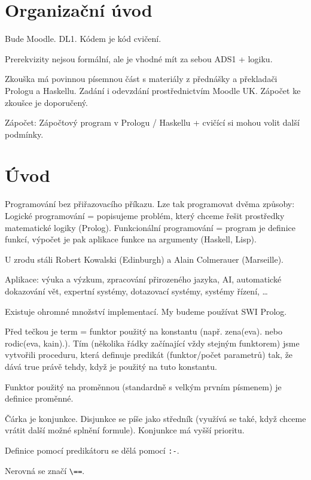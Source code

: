 \documentclass[12pt]{article}					%
\begin{document}

\section*{Organizační úvod}
\begin{poznamka}
	Bude Moodle. DL1. Kódem je kód cvičení.

	Prerekvizity nejsou formální, ale je vhodné mít za sebou ADS1 + logiku.

	Zkouška má povinnou písemnou část s materiály z přednášky a překladači Prologu a Haskellu. Zadání i odevzdání prostřednictvím Moodle UK. Zápočet ke zkoušce je doporučený.

	Zápočet: Zápočtový program v Prologu / Haskellu + cvičící si mohou volit další podmínky.
\end{poznamka}

\section{Úvod}
\begin{definice}
	Programování bez přiřazovacího příkazu. Lze tak programovat dvěma způsoby: Logické programování = popisujeme problém, který chceme řešit prostředky matematické logiky (Prolog). Funkcionální programování = program je definice funkcí, výpočet je pak aplikace funkce na argumenty (Haskell, Lisp).
\end{definice}

\begin{definice}[Prolog]
	U zrodu stáli Robert Kowalski (Edinburgh) a Alain Colmerauer (Marseille).

	Aplikace: výuka a výzkum, zpracování přirozeného jazyka, AI, automatické dokazování vět, expertní systémy, dotazovací systémy, systémy řízení, …

	Existuje ohromné množství implementací. My budeme používat SWI Prolog.
\end{definice}

\begin{definice}
	Před tečkou je term = funktor použitý na konstantu (např. zena(eva). nebo rodic(eva, kain).). Tím (několika řádky začínající vždy stejným funktorem) jsme vytvořili proceduru, která definuje predikát (funktor/počet parametrů) tak, že dává true právě tehdy, když je použitý na tuto konstantu.

	Funktor použitý na proměnnou (standardně s velkým prvním písmenem) je definice proměnné.

	Čárka je konjunkce. Disjunkce se píše jako středník (využívá se také, když chceme vrátit další možné splnění formule). Konjunkce má vyšší prioritu.

	Definice pomocí predikátoru se dělá pomocí \verb|:-|.

	Nerovná se značí \verb|\==|.
\end{definice}
\end{document}

